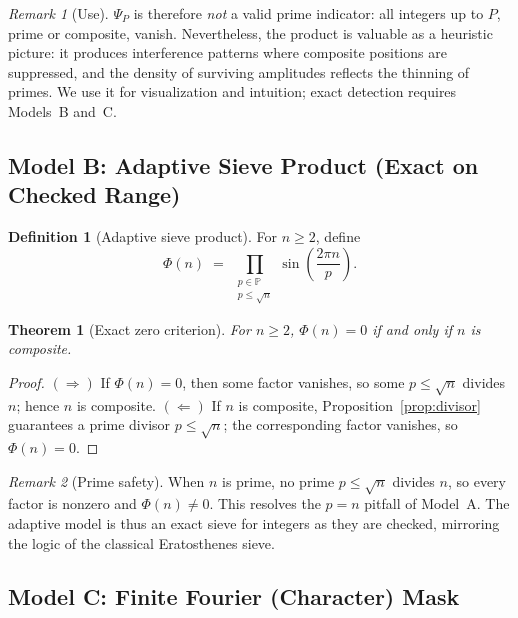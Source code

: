 \documentclass[12pt]{article}
\newtheorem{theorem}{Theorem}
\theoremstyle{definition}
\newtheorem{definition}{Definition}
\theoremstyle{remark}
\newtheorem{remark}{Remark}
\newcommand{\Primes}{\mathbb{P}}
\begin{document}
\begin{remark}[Use]
\(\Psi_P\) is therefore \emph{not} a valid prime indicator: all integers up to \(P\), prime or composite, vanish. Nevertheless, the product is valuable as a heuristic picture: it produces interference patterns where composite positions are suppressed, and the density of surviving amplitudes reflects the thinning of primes. We use it for visualization and intuition; exact detection requires Models~B and~C.
\end{remark}

\subsection{Model B: Adaptive Sieve Product (Exact on Checked Range)}

\begin{definition}[Adaptive sieve product]
For \(n\ge 2\), define
\[
  \Phi(n)\;=\; \prod_{\substack{p\in\Primes\\ p\le \sqrt{n}}} \sin\!\left(\frac{2\pi n}{p}\right).
\]
\end{definition}

\begin{theorem}[Exact zero criterion]\label{thm:adaptive-exact}
For \(n\ge 2\), \(\Phi(n)=0\) if and only if \(n\) is composite.
\end{theorem}
\begin{proof}
\((\Rightarrow)\) If \(\Phi(n)=0\), then some factor vanishes, so some \(p\le\sqrt{n}\) divides \(n\); hence \(n\) is composite.  
\((\Leftarrow)\) If \(n\) is composite, Proposition~\ref{prop:divisor} guarantees a prime divisor \(p\le\sqrt{n}\); the corresponding factor vanishes, so \(\Phi(n)=0\).
\end{proof}

\begin{remark}[Prime safety]
When \(n\) is prime, no prime \(p\le \sqrt{n}\) divides \(n\), so every factor is nonzero and \(\Phi(n)\neq 0\). This resolves the \(p=n\) pitfall of Model~A. The adaptive model is thus an exact sieve for integers as they are checked, mirroring the logic of the classical Eratosthenes sieve.
\end{remark}

\subsection{Model C: Finite Fourier (Character) Mask}\label{subsec:fourier}
\end{document}
